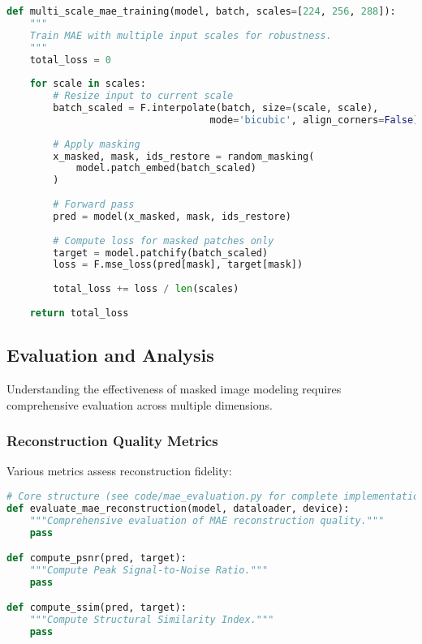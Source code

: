 \begin{lstlisting}[language=Python, caption=Multi-scale masked image modeling training]
def multi_scale_mae_training(model, batch, scales=[224, 256, 288]):
    """
    Train MAE with multiple input scales for robustness.
    """
    total_loss = 0
    
    for scale in scales:
        # Resize input to current scale
        batch_scaled = F.interpolate(batch, size=(scale, scale), 
                                   mode='bicubic', align_corners=False)
        
        # Apply masking
        x_masked, mask, ids_restore = random_masking(
            model.patch_embed(batch_scaled)
        )
        
        # Forward pass
        pred = model(x_masked, mask, ids_restore)
        
        # Compute loss for masked patches only
        target = model.patchify(batch_scaled)
        loss = F.mse_loss(pred[mask], target[mask])
        
        total_loss += loss / len(scales)
    
    return total_loss
\end{lstlisting}

\subsection{Evaluation and Analysis}

Understanding the effectiveness of masked image modeling requires comprehensive evaluation across multiple dimensions.

\subsubsection{Reconstruction Quality Metrics}

Various metrics assess reconstruction fidelity:

\begin{lstlisting}[language=Python, caption=Comprehensive evaluation of MAE reconstruction quality]
# Core structure (see code/mae_evaluation.py for complete implementation)
def evaluate_mae_reconstruction(model, dataloader, device):
    """Comprehensive evaluation of MAE reconstruction quality."""
    pass

def compute_psnr(pred, target):
    """Compute Peak Signal-to-Noise Ratio."""
    pass

def compute_ssim(pred, target):
    """Compute Structural Similarity Index."""
    pass
\end{lstlisting}

